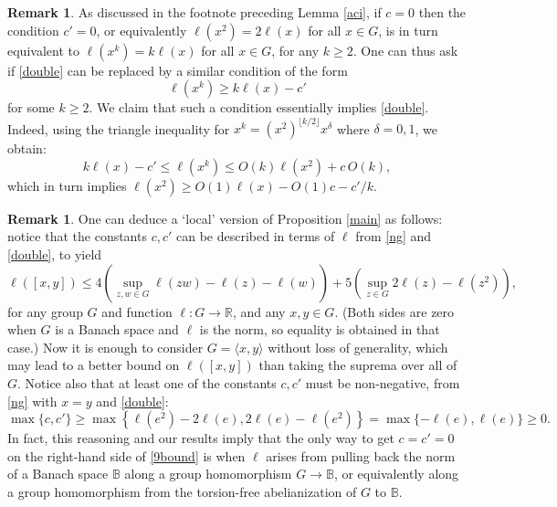 \documentclass[11pt,a4paper,reqno]{amsart}
\numberwithin{equation}{section}
\theoremstyle{plain}
\theoremstyle{definition}
\newtheorem{remark}[equation]{Remark}
\newcommand\R{\mathbb{R}}
\newcommand\normsymb{\ell}  %
\newcommand\norm[1]{\ell({#1})}   %
\begin{document}
\begin{remark}
As discussed in the footnote preceding Lemma \ref{aci}, if $c=0$ then the
condition $c'=0$, or equivalently $\norm{x^2} = 2 \norm{x}$ for all $x \in
G$, is in turn equivalent to $\norm{x^k} = k \norm{x}$ for all $x \in G$,
for any $k \geq 2$. One can thus ask if \eqref{double} can be replaced by
a similar condition of the form
\[
\norm{x^k} \geq k \norm{x} - c'
\]
for some $k \geq 2$. We claim that such a condition essentially implies
\eqref{double}. Indeed, using the triangle inequality for $x^k =
(x^2)^{\lfloor k/2 \rfloor} x^\delta$ where $\delta=0,1$, we obtain:
\[
k \norm{x} - c' \leq \norm{x^k} \leq O(k) \norm{x^2} + c \, O(k),
\]
which in turn implies $\norm{x^2} \geq O(1) \norm{x} - O(1) c - c'/k$.
\end{remark}


\begin{remark}
One can deduce a `local' version of Proposition \ref{main} as follows:
notice that the constants $c,c'$ can be described in terms of $\normsymb$
from \eqref{ng} and \eqref{double}, to yield
\begin{equation}\label{9bound}
\norm{ [x,y] } \leq 4 \left( \sup_{z,w \in G} \norm{zw} - \norm{z} -
\norm{w} \right) + 5 \left( \sup_{z \in G} 2 \norm{z} - \norm{z^2}
\right),
\end{equation}
for any group $G$ and function $\normsymb : G \to \R$, and any $x,y \in
G$.
(Both sides are zero when $G$ is a Banach space and $\normsymb$ is the
norm, so equality is obtained in that case.)
Now it is enough to consider $G = \langle x,y\rangle$ without loss of
generality, which may lead to a better bound on $\norm{ [x,y] }$ than
taking the suprema over all of $G$.
Notice also that at least one of the constants $c,c'$ must be
non-negative, from \eqref{ng} with $x=y$ and \eqref{double}:
\begin{equation}\label{Enonneg}
\max \{ c, c' \} \geq \max\left\{ \norm{e^2} - 2 \norm{e}, 2 \norm{e} -
\norm{e^2}\right\} = \max \{ -\norm{e}, \norm{e} \} \geq 0.
\end{equation}
In fact, this reasoning and our results imply that the only way to get
$c=c'=0$ on the right-hand side of \eqref{9bound} is when $\normsymb$
arises from pulling back the norm of a Banach space $\mathbb{B}$ along a
group homomorphism $G\to\mathbb{B}$, or equivalently along a group
homomorphism from the torsion-free abelianization of $G$ to $\mathbb{B}$.
\end{remark}


\end{document}
